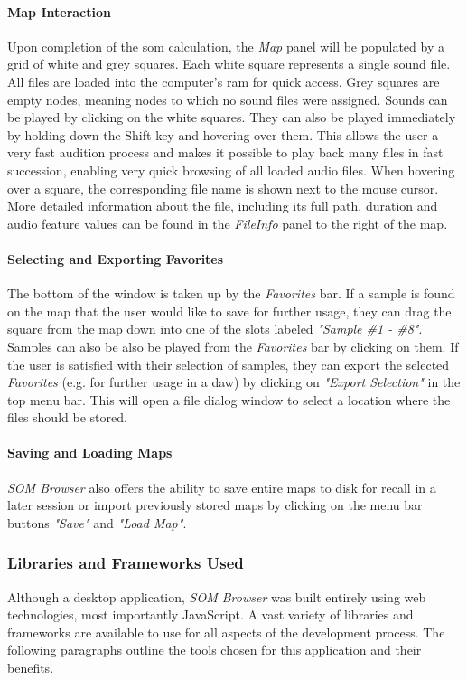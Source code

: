 \paragraph*{Map Interaction}
Upon completion of the \gls{som} calculation, the \textit{Map} panel will be
populated by a grid of white and grey squares. Each white square represents a
single sound file. All files are loaded into the computer's \gls{ram} for quick
access. Grey squares are empty nodes, meaning nodes to which no sound
files were assigned. Sounds can be played by clicking on the white squares.
They can also be played immediately by holding down the Shift key and hovering
over them.
This allows the user a very fast audition process and makes it
possible to play back many files in fast succession, enabling very quick
browsing of all loaded audio files. When hovering over a square, the
corresponding file name is shown next to the mouse cursor. More detailed
information about the file, including its full path, duration and audio feature
values can be found in the \textit{FileInfo} panel to the right of the map.

\paragraph*{Selecting and Exporting Favorites}
The bottom of the window is taken up by the \textit{Favorites} bar. If a sample
is found on the map that the user would like to save for further usage, they can
drag the square from the map down into one of the slots labeled
\textit{"Sample \#1 - \#8"}. Samples can also be also be played from the
\textit{Favorites} bar by clicking on them. If the user is satisfied with their
selection of samples, they can export the selected \textit{Favorites} (e.g. for
further usage in a \gls{daw}) by clicking on \textit{"Export Selection"} in the
top menu bar. This will open a file dialog window to select a location where the
files should be stored.

\paragraph*{Saving and Loading Maps}
\textit{SOM Browser} also offers the ability to save entire maps to disk for
recall in a later session or import previously stored maps by clicking on the
menu bar buttons \textit{"Save"} and \textit{"Load Map"}.

\subsubsection{Libraries and Frameworks Used}
\label{subsubsec:som-browser_libraries}
Although a desktop application, \textit{SOM Browser} was built entirely using
web technologies, most importantly JavaScript. A vast variety of libraries and
frameworks are available to use for all aspects of the development process.
The following paragraphs outline the tools chosen for this application and their
benefits.

